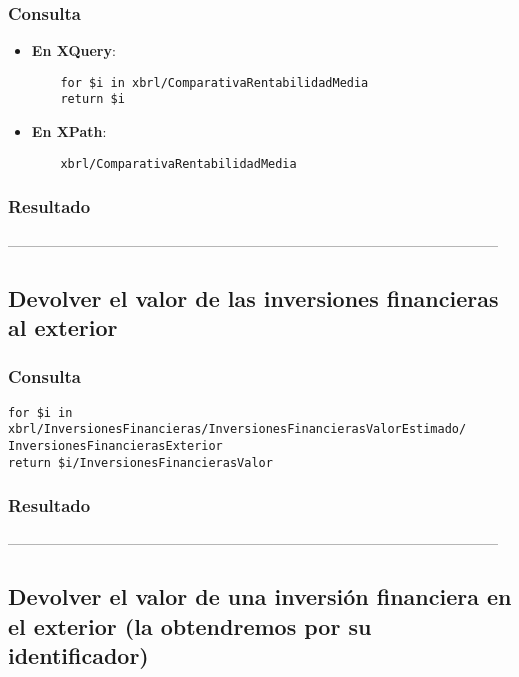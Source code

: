\documentclass[11pt]{diazessay} %
\begin{document}
\subsubsection*{Consulta}
\begin{itemize}
	\item \textbf{En XQuery}:
	\lstset{language=C}
	\begin{lstlisting}
	for $i in xbrl/ComparativaRentabilidadMedia
	return $i
	\end{lstlisting}
	
	\item \textbf{En XPath}:
	\lstset{language=C}
	\begin{lstlisting}
	xbrl/ComparativaRentabilidadMedia
	\end{lstlisting}
\end{itemize}

\subsubsection*{Resultado}
 
---------------------------------------------------------------------------------------------------------\\

\subsection*{Devolver el valor de las inversiones financieras al exterior}
\subsubsection*{Consulta}
\lstset{language=C}
\begin{lstlisting}
for $i in xbrl/InversionesFinancieras/InversionesFinancierasValorEstimado/
InversionesFinancierasExterior
return $i/InversionesFinancierasValor
\end{lstlisting}

\subsubsection*{Resultado}
 
---------------------------------------------------------------------------------------------------------\\

\subsection*{Devolver el valor de una inversión financiera en el exterior (la obtendremos por su identificador)}
\end{document}
